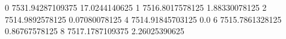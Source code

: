 0 7531.94287109375 17.0244140625
1 7516.8017578125 1.88330078125
2 7514.9892578125 0.07080078125
4 7514.91845703125 0.0
6 7515.7861328125 0.86767578125
8 7517.1787109375 2.26025390625
